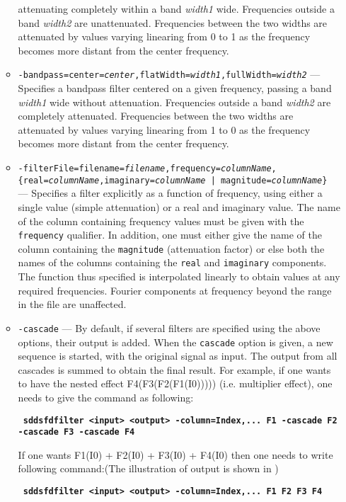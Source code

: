 \begin{itemize}
\begin{itemize}
    attenuating completely within a band {\em width1} wide.  
    Frequencies outside a band {\em width2} are unattenuated. 
    Frequencies between the two widths are attenuated by values varying 
    linearing from 0 to 1 as the frequency becomes more distant from 
    the center frequency. 
    \item {\tt -bandpass=center={\em center},flatWidth={\em width1},fullWidth={\em width2}} 
    --- Specifies a bandpass filter centered on a given frequency,  
    passing a band {\em width1} wide without attenuation. 
    Frequencies outside a band {\em width2} are completely attenuated. 
    Frequencies between the two widths are attenuated by values varying 
    linearing from 1 to 0 as the frequency becomes more distant from 
    the center frequency. 
    \item {\tt -filterFile=filename={\em filename},frequency={\em columnName},}
        {\tt \{real={\em columnName},imaginary={\em columnName} | magnitude={\em columnName}\} }
        --- Specifies a filter explicitly 
    as a function of frequency, using either a single value  
    (simple attenuation) or a real and imaginary value. 
    The name of the column containing frequency values must be 
    given with the {\tt frequency} qualifier. 
    In addition, one must either give the name of the column  
    containing the {\tt magnitude} (attenuation factor) or else 
    both the names of the columns containing  
    the {\tt real} and {\tt imaginary} components.   
    The function thus specified is interpolated linearly to 
    obtain values at any required frequencies.  Fourier components 
    at frequency beyond the range in the file are unaffected. 
    \item {\tt -cascade} --- By default, if several filters are 
    specified using the above options, their output is added.
    When the {\tt cascade} option is given, a 
    new sequence is started, with the original signal as input. 
    The output from all cascades is summed to obtain the final 
    result. For example, if one wants to have the nested effect 
    F4(F3(F2(F1(I0))))) (i.e. multiplier effect), one needs to give the command as following:
     \begin{flushleft}{\tt \bf
    sddsfdfilter <input> <output> -column=Index,... F1 -cascade F2 -cascade F3 -cascade F4 
     }\end{flushleft}

    If one wants F1(I0) + F2(I0) + F3(I0) + F4(I0) then one needs to write following command:(The illustration of output is shown in )
    \begin{flushleft}{\tt \bf
    sddsfdfilter <input> <output> -column=Index,... F1 F2 F3 F4 
    }\end{flushleft}


\end{itemize}
\end{itemize}

